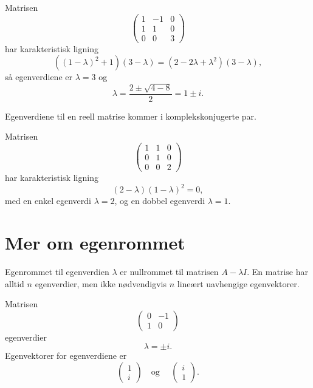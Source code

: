 \begin{ex}
Matrisen
\[
\begin{pmatrix}
1 & -1 & 0\\ 1 &1 &0 \\ 0 & 0 & 3
\end{pmatrix}
\]
har karakteristisk ligning
\[
((1-\lambda)^2+1)(3-\lambda)=(2-2\lambda+\lambda^2)(3-\lambda),
\]
så egenverdiene er $\lambda=3$ og
\[
\lambda=\frac{2\pm\sqrt{4-8}}{2}=1\pm i.
\] 
\end{ex}

\begin{thm}
Egenverdiene til en reell matrise kommer i komplekskonjugerte par.
\end{thm}


\begin{ex}
Matrisen
\[
\begin{pmatrix}
1 & 1 & 0\\  0 &1 & 0 \\ 0 & 0 & 2
\end{pmatrix}
\]
har karakteristisk ligning
\[
(2-\lambda)(1-\lambda)^2=0,
\]
med en enkel egenverdi $\lambda=2$, og en dobbel egenverdi $\lambda=1$. 
\end{ex}


\section*{Mer om egenrommet}
Egenrommet til egenverdien $\lambda$ er nullrommet til matrisen $A-\lambda I$.
En matrise har alltid $n$ egenverdier, 
men ikke nødvendigvis $n$ lineært uavhengige egenvektorer.

\begin{ex}
Matrisen
\[
\begin{pmatrix}
0 & -1 \\ 1 &0
\end{pmatrix}
\]
egenverdier
\[
\lambda=\pm i.
\] 
Egenvektorer for egenverdiene er 
\[
\begin{pmatrix}
1  \\ i
\end{pmatrix}
\quad \text{og }\quad
\begin{pmatrix}
i  \\ 1
\end{pmatrix}.
\]
\end{ex}


